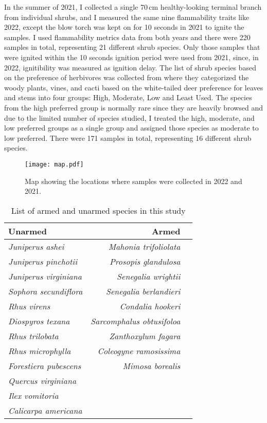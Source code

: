\documentclass{ttuthes2007}
\begin{document}
In the summer of 2021, I collected a single 70\,cm healthy-looking terminal branch from individual shrubs, and I measured the same nine flammability traits like 2022, except the blow torch was kept on for 10 seconds in 2021 to ignite the samples.  I used flammability metrics data from both years and there were 220 samples in total, representing 21 different shrub species. Only those samples that were ignited within the 10 seconds ignition period were used from 2021, since, in 2022, ignitibility was measured as ignition delay. The list of shrub species based on the preference of herbivores was collected from \citep{wright2003white} where they categorized the woody plants, vines, and cacti based on the white-tailed deer preference for leaves and stems  into four groups: High, Moderate, Low and Least Used. The species from the high preferred group is normally rare since they are heavily browsed and due to the limited number of species studied, I treated the high, moderate, and low preferred groups as a single group and assigned those species as moderate to low preferred. There were 171 samples in total, representing 16 different shrub species.\\

 \begin{figure}
     \centering
     \texttt{[image: map.pdf]}
    
     \caption{Map showing the locations where samples were collected in 2022 and 2021.}
 \end{figure}

\begin{table}
    \centering
    \begin{tabular}{lrr}
          Unarmed &  Armed \\
          \hline
          \emph{Juniperus ashei} & \emph{Mahonia trifoliolata}\\
          \emph{Juniperus pinchotii} & \emph{Prosopis glandulosa}\\
          \emph{Juniperus virginiana} & \emph{Senegalia wrightii}\\
          \emph{Sophora secundiflora} & \emph{Senegalia berlandieri}\\
          \emph{Rhus virens} & \emph{Condalia hookeri}\\
          \emph{Diospyros texana} & \emph{Sarcomphalus obtusifoloa}\\
          \emph{Rhus trilobata} & \emph{Zanthoxylum fagara}\\
          \emph{Rhus microphylla} & \emph{Coleogyne ramosissima}\\
          \emph{Forestiera pubescens} & \emph{Mimosa borealis}\\
          \emph{Quercus virginiana} &   \\
          \emph{Ilex vomitoria} &    \\
          \emph{Calicarpa americana} & \\
    \end{tabular}
    \caption{List of armed and unarmed species in this study}
\end{table} 
\end{document}

